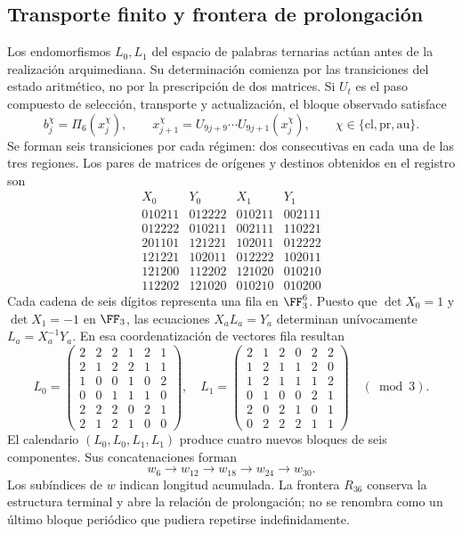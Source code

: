 \subsection{Transporte finito y frontera de prolongación}

Los endomorfismos \(L_0,L_1\) del espacio de palabras ternarias actúan antes de la realización arquimediana. Su determinación comienza por las transiciones del estado aritmético, no por la prescripción de dos matrices. Si \(U_t\) es el paso compuesto de selección, transporte y actualización, el bloque observado satisface
\[
 b_j^\chi=\Pi_6(x_j^\chi),\qquad
 x_{j+1}^\chi=U_{9j+9}\cdots U_{9j+1}(x_j^\chi),
 \qquad \chi\in\{\mathrm{cl},\mathrm{pr},\mathrm{au}\}.
\]
Se forman seis transiciones por cada régimen: dos consecutivas en cada una de las tres regiones. Los pares de matrices de orígenes y destinos obtenidos en el registro son
\[
\begin{array}{c|c|c|c}
X_0&Y_0&X_1&Y_1\\\hline
010211&012222&010211&002111\\
012222&010211&002111&110221\\
201101&121221&102011&012222\\
121221&102011&012222&102011\\
121200&112202&121020&010210\\
112202&121020&010210&010200
\end{array}
\]
Cada cadena de seis dígitos representa una fila en \(\FF_3^6\). Puesto que \(\det X_0=1\) y \(\det X_1=-1\) en \(\FF_3\), las ecuaciones \(X_aL_a=Y_a\) determinan unívocamente \(L_a=X_a^{-1}Y_a\). En esa coordenatización de vectores fila resultan
\[
 L_0=\begin{pmatrix}
 2&2&2&1&2&1\\2&1&2&2&1&1\\1&0&0&1&0&2\\
 0&0&1&1&1&0\\2&2&2&0&2&1\\2&1&2&1&0&0
 \end{pmatrix},\quad
 L_1=\begin{pmatrix}
 2&1&2&0&2&2\\1&2&1&1&2&0\\1&2&1&1&1&2\\
 0&1&0&0&2&1\\2&0&2&1&0&1\\0&2&2&2&1&1
 \end{pmatrix}\quad(\bmod3).
\]
El calendario \((L_0,L_0,L_1,L_1)\) produce cuatro nuevos bloques de seis componentes. Sus concatenaciones forman
\[
 w_6\longrightarrow w_{12}\longrightarrow w_{18}
 \longrightarrow w_{24}\longrightarrow w_{30}.
\]
Los subíndices de \(w\) indican longitud acumulada. La frontera \(R_{36}\) conserva la estructura terminal y abre la relación de prolongación; no se renombra como un último bloque periódico que pudiera repetirse indefinidamente.


